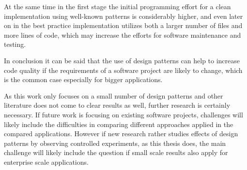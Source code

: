 At the same time in the first stage the initial programming effort for a clean implementation using well-known patterns is considerably higher, and even later on in the best practice implementation utilizes both a larger number of files and more lines of code, which may increase the efforts for software maintenance and testing.

In conclusion it can be said that the use of design patterns can help to increase code quality if the requirements of a software project are likely to change, which is the common case especially for bigger applications. 

As this work only focuses on a small number of design patterns and other literature does not come to clear results as well, further research is certainly necessary. If future work is focusing on existing software projects, challenges will likely include the difficulties in comparing different approaches applied in the compared applications. However if new research rather studies effects of design patterns by observing controlled experiments, as this thesis does, the main challenge will likely include the question if small scale results also apply for enterprise scale applications.

